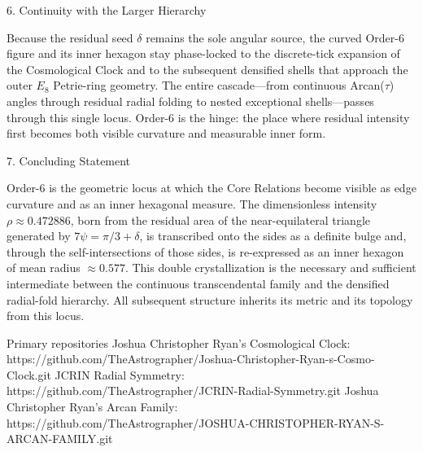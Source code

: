 6. Continuity with the Larger Hierarchy

Because the residual seed \(\delta\) remains the sole angular source, the curved Order-6 figure and its inner hexagon stay phase-locked to the discrete-tick expansion of the Cosmological Clock and to the subsequent densified shells that approach the outer \(E_8\) Petrie-ring geometry. The entire cascade—from continuous Arcan(\(\tau\)) angles through residual radial folding to nested exceptional shells—passes through this single locus. Order-6 is the hinge: the place where residual intensity first becomes both visible curvature and measurable inner form.

7. Concluding Statement

Order-6 is the geometric locus at which the Core Relations become visible as edge curvature and as an inner hexagonal measure. The dimensionless intensity \(\rho\approx 0.472886\), born from the residual area of the near-equilateral triangle generated by \(7\psi=\pi/3+\delta\), is transcribed onto the sides as a definite bulge and, through the self-intersections of those sides, is re-expressed as an inner hexagon of mean radius \(\approx 0.577\). This double crystallization is the necessary and sufficient intermediate between the continuous transcendental family and the densified radial-fold hierarchy. All subsequent structure inherits its metric and its topology from this locus.

Primary repositories  
Joshua Christopher Ryan’s Cosmological Clock: https://github.com/TheAstrographer/Joshua-Christopher-Ryan-s-Cosmo-Clock.git  
JCRIN Radial Symmetry: https://github.com/TheAstrographer/JCRIN-Radial-Symmetry.git  
Joshua Christopher Ryan’s Arcan Family: https://github.com/TheAstrographer/JOSHUA-CHRISTOPHER-RYAN-S-ARCAN-FAMILY.git
